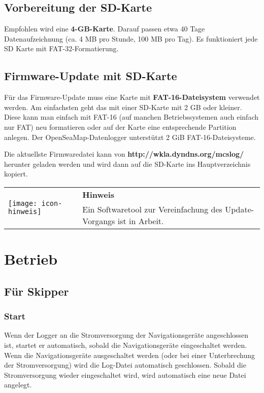 \documentclass[pdftex, fontsize=8pt, paper=130mm:92mm,pagesize]{scrartcl}
\let\stdsection\section
\renewcommand\section{\newpage\stdsection}
\newlength{\iconwidth}
\newenvironment{displaybox}[2]{%
  \begin{center}
    \setlength\arrayrulewidth{0.75pt}%
    \arrayrulecolor{white}%
    \renewcommand{\arraystretch}{1.3}%
    \begin{tabular}{p{\iconwidth}p{\linewidth-4\tabcolsep-\iconwidth}}
      \multirow{2}{*}{#2}&\cellcolor{boxheadcol}\textbf{\color{white}#1} \\%
      \hhline{~-}%
      &\cellcolor{boxcol}%
}{%
      \\
    \end{tabular}
  \end{center}%
\arrayrulecolor{black}
}
\newenvironment{Hinweis}{%
\begin{displaybox}{Hinweis}{\texttt{[image: icon-hinweis]}}}%
{\end{displaybox}}
\begin{document}
\subsection{Vorbereitung der SD-Karte}

Empfohlen wird eine \textbf{4-GB-Karte}. Darauf passen etwa 40 Tage Datenaufzeichnung (ca. 4 MB pro Stunde, 100 MB pro Tag). Es funktioniert jede SD Karte mit FAT-32-Formatierung. 

\subsection{Firmware-Update mit SD-Karte}\label{sec:firmware}

Für das Firmware-Update muss eine Karte mit \textbf{FAT-16-Dateisystem} verwendet werden. Am einfachsten geht das mit einer SD-Karte mit 2 GB oder kleiner. Diese kann man einfach mit FAT-16 (auf manchen Betriebssystemen auch einfach nur FAT) neu formatieren oder auf der Karte eine entsprechende Partition anlegen. Der OpenSeaMap-Datenlogger unterstützt 2 GiB FAT-16-Dateisysteme. 

Die aktuellste Firmwaredatei kann von \textbf{http://wkla.dyndns.org/mcslog/} herunter geladen werden und wird dann auf die SD-Karte ins Hauptverzeichnis kopiert. 

\begin{Hinweis}
Ein Softwaretool zur Vereinfachung des Update-Vorgangs ist in Arbeit. 
\end{Hinweis}

\section{Betrieb}

\subsection{Für Skipper}

\subsubsection{Start}

Wenn der Logger an die Stromversorgung der Navigationsgeräte angeschlossen ist, startet er automatisch, sobald die Navigationsgeräte eingeschaltet werden. Wenn die Navigationsgeräte ausgeschaltet werden (oder bei einer Unterbrechung der Stromversorgung) wird die Log-Datei automatisch geschlossen. Sobald die Stromversorgung wieder eingeschaltet wird, wird automatisch eine neue Datei angelegt. 
\end{document}
